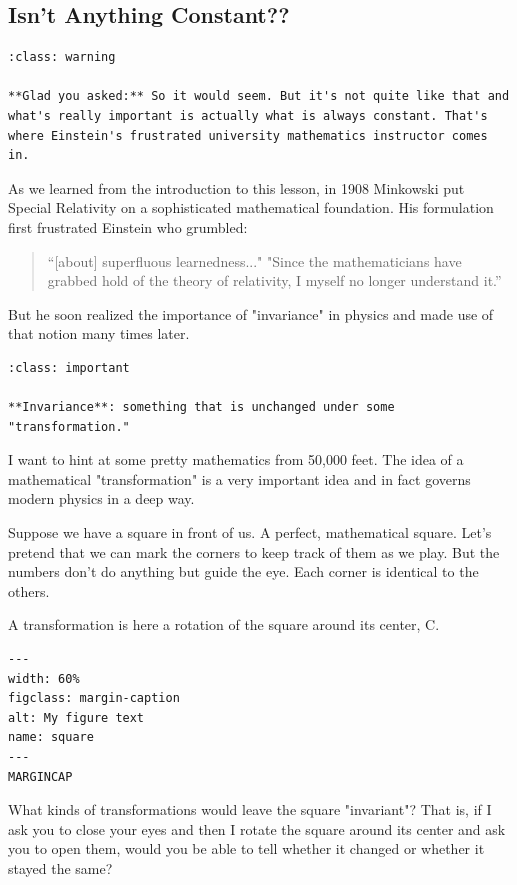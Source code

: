 \documentclass[
]{article}
\begin{document}
\hypertarget{isnt-anything-constant}{%
\subsection{Isn't Anything Constant??}\label{isnt-anything-constant}}

\begin{verbatim}
:class: warning

**Glad you asked:** So it would seem. But it's not quite like that and what's really important is actually what is always constant. That's where Einstein's frustrated university mathematics instructor comes in.
\end{verbatim}

As we learned from the introduction to this lesson, in 1908 Minkowski
put Special Relativity on a sophisticated mathematical foundation. His
formulation first frustrated Einstein who grumbled:

\begin{quote}
``{[}about{]} superfluous learnedness..." "Since the mathematicians have
grabbed hold of the theory of relativity, I myself no longer understand
it.''
\end{quote}

But he soon realized the importance of "invariance" in physics and made
use of that notion many times later.

\begin{verbatim}
:class: important

**Invariance**: something that is unchanged under some "transformation."
\end{verbatim}

I want to hint at some pretty mathematics from 50,000 feet. The idea of
a mathematical "transformation" is a very important idea and in fact
governs modern physics in a deep way.

Suppose we have a square in front of us. A perfect, mathematical square.
Let's pretend that we can mark the corners to keep track of them as we
play. But the numbers don't do anything but guide the eye. Each corner
is identical to the others.

A transformation is here a rotation of the square around its center, C.

\begin{verbatim}
---
width: 60%
figclass: margin-caption
alt: My figure text
name: square
---
MARGINCAP
\end{verbatim}

What kinds of transformations would leave the square "invariant"? That
is, if I ask you to close your eyes and then I rotate the square around
its center and ask you to open them, would you be able to tell whether
it changed or whether it stayed the same?
\end{document}
